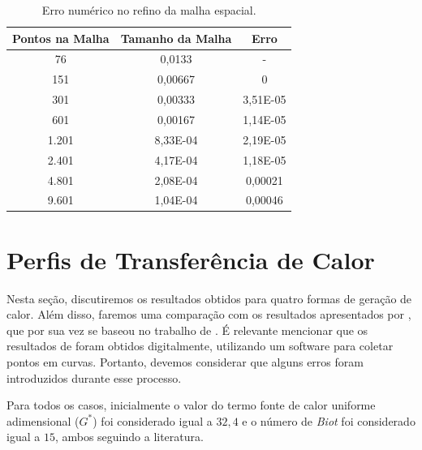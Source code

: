 \begin{table}[H]
    \centering
    \caption{Erro numérico no refino da malha espacial.}
    \begin{tabular}{ccc}
        \textbf{Pontos na   Malha} & \textbf{Tamanho da Malha} & \textbf{Erro} \\ \hline
        76                         & 0,0133                    & -             \\
        151                        & 0,00667                   & 0             \\
        301                        & 0,00333                   & 3,51E-05      \\
        601                        & 0,00167                   & 1,14E-05      \\
        1.201                      & 8,33E-04                  & 2,19E-05      \\
        2.401                      & 4,17E-04                  & 1,18E-05      \\
        4.801                      & 2,08E-04                  & 0,00021       \\
        9.601                      & 1,04E-04                  & 0,00046      
    \end{tabular}
    \label{tab:error_in_the_spatial_mesh}
\end{table}


\section{Perfis de Transferência de Calor}

Nesta seção, discutiremos os resultados obtidos para quatro formas de geração de calor. Além disso, faremos uma comparação com os resultados apresentados por \citet{soares2017}, que por sua vez se baseou no trabalho de \citet{bhattacharya2001}. É relevante mencionar que os resultados de \citet{soares2017} foram obtidos digitalmente, utilizando um software para coletar pontos em curvas. Portanto, devemos considerar que alguns erros foram introduzidos durante esse processo.

Para todos os casos, inicialmente o valor do termo fonte de calor uniforme adimensional (\(G ^*\)) foi considerado igual a \(32,4\) e o número de \textit{Biot} foi considerado igual a \(15\), ambos seguindo a literatura.

